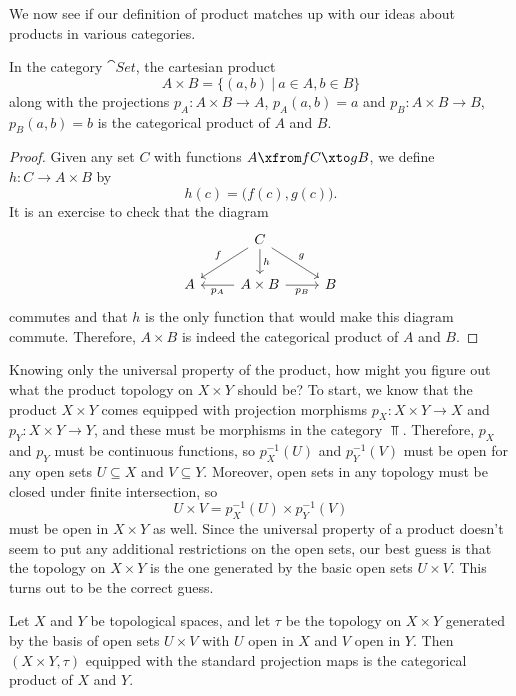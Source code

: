 \documentclass[noname]{notes}
\begin{document}
We now see if our definition of product matches up with our ideas about products in various categories. 

\begin{proposition}
\label{product in sets}
	In the category $\cat{Set}$, the cartesian product 
	\[
		A \times B = \Big\{ (a,b) \ \Big\vert\ a \in A, b \in B \Big\}
	\]
	along with the projections $p_A \colon A \times B \to A$, $p_A(a,b) = a$ and $p_B \colon A \times B \to B$, $p_B(a,b) = b$ is the categorical product of $A$ and $B$. 
\end{proposition}

\begin{proof}
	Given any set $C$ with functions $A \xfrom f C \xto g B$, we define $h \colon C \to A \times B$ by 
	\[
		h(c) = \Big(f(c), g(c) \Big).
	\]
	It is an exercise to check that the diagram 
	\[
		\begin{tikzcd}
			& C \ar[d, "h"] \ar[dl, "f"'] \ar[dr, "g"] \\
			A & \ar[l, "p_A"] A \times B \ar[r, "p_B"'] & B
		\end{tikzcd}
	\]
	commutes and that $h$ is the only function that would make this diagram commute. Therefore, $A \times B$ is indeed the categorical product of $A$ and $B$. 
\end{proof}

Knowing only the universal property of the product, how might you figure out what the product topology on $X \times Y$ should be? To start, we know that the product $X \times Y$ comes equipped with projection morphisms $p_X \colon X \times Y \to X$ and $p_Y \colon X \times Y \to Y$, and these must be morphisms in the category $\Top$. Therefore, $p_X$ and $p_Y$ must be continuous functions, so $p_X^{-1}(U)$ and $p_Y^{-1}(V)$ must be open for any open sets $U \subseteq X$ and $V \subseteq Y$. Moreover, open sets in any topology must be closed under finite intersection, so 
\[
	U \times V = p_X^{-1}(U) \times p_Y^{-1}(V) 
\]
must be open in $X \times Y$ as well. Since the universal property of a product doesn't seem to put any additional restrictions on the open sets, our best guess is that the topology on $X \times Y$ is the one generated by the basic open sets $U \times V$. This turns out to be the correct guess.  

\begin{proposition}
	Let $X$ and $Y$ be topological spaces, and let $\tau$ be the topology on $X \times Y$ generated by the basis of open sets $U \times V$ with $U$ open in $X$ and $V$ open in $Y$. Then $(X \times Y, \tau)$ equipped with the standard projection maps is the categorical product of $X$ and $Y$. 
\end{proposition}
\end{document}
